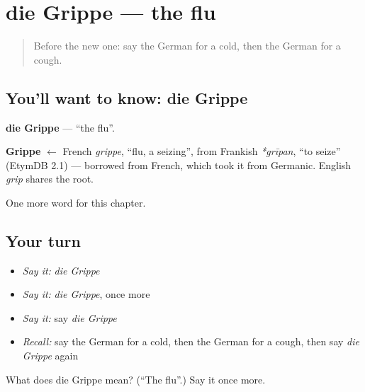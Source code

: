 \section[die Grippe]{die Grippe — the flu}

\label{lesson:GE-C156-grippe}



\begin{quote}
Before the new one: say the German for a cold, then the German for a cough.
\end{quote}

\subsection*{You'll want to know: die Grippe}
\textbf{die Grippe} — \textquotedblleft{}the flu\textquotedblright{}.

\begin{cousinweb}
\textbf{Grippe} $\leftarrow$ French \emph{grippe}, \textquotedblleft{}flu, a seizing\textquotedblright{}, from Frankish \emph{*grīpan}, \textquotedblleft{}to seize\textquotedblright{} (EtymDB 2.1) — borrowed from French, which took it from Germanic. English \emph{grip} shares the root.
\end{cousinweb}

\begin{grammarlens}[title={What you've built}]
One more word for this chapter.
\end{grammarlens}

\subsection*{Your turn}
\begin{itemize}
\raggedright
  \item \emph{Say it:} \emph{die Grippe}
  \item \emph{Say it:} \emph{die Grippe}, once more
  \item \emph{Say it:} say \emph{die Grippe}
  \item \emph{Recall:} say the German for a cold, then the German for a cough, then say \emph{die Grippe} again
\end{itemize}

\begin{tcolorbox}[breakable,colback=teal!4,colframe=teal!35!black,title={Before you move on}]
What does die Grippe mean? (\textquotedblleft{}The flu\textquotedblright{}.) Say it once more.
\end{tcolorbox}
